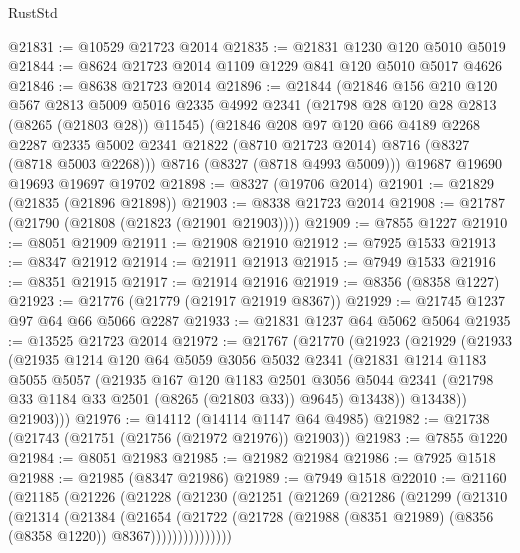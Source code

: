 \begin{lexlean}{RustStd}
\begin{coremodule}
@21831 := @10529 @21723 @2014
@21835 := @21831 @1230 @120 @5010 @5019
@21844 := @8624 @21723 @2014 @1109 @1229 @841 @120 @5010 @5017 @4626
@21846 := @8638 @21723 @2014
@21896 := @21844
    (@21846
      @156
      @210
      @120
      @567
      @2813
      @5009
      @5016
      @2335
      @4992
      @2341
      (@21798 @28 @120 @28 @2813 (@8265 (@21803 @28)) @11545)
      (@21846
        @208
        @97
        @120
        @66
        @4189
        @2268
        @2287
        @2335
        @5002
        @2341
        @21822
        (@8710 @21723 @2014)
        @8716
        (@8327 (@8718 @5003 @2268)))
      @8716
      (@8327 (@8718 @4993 @5009)))
    @19687
    @19690
    @19693
    @19697
    @19702
@21898 := @8327 (@19706 @2014)
@21901 := @21829 (@21835 (@21896 @21898))
@21903 := @8338 @21723 @2014
@21908 := @21787 (@21790 (@21808 (@21823 (@21901 @21903))))
@21909 := @7855 @1227
@21910 := @8051 @21909
@21911 := @21908 @21910
@21912 := @7925 @1533
@21913 := @8347 @21912
@21914 := @21911 @21913
@21915 := @7949 @1533
@21916 := @8351 @21915
@21917 := @21914 @21916
@21919 := @8356 (@8358 @1227)
@21923 := @21776 (@21779 (@21917 @21919 @8367))
@21929 := @21745 @1237 @97 @64 @66 @5066 @2287
@21933 := @21831 @1237 @64 @5062 @5064
@21935 := @13525 @21723 @2014
@21972 := @21767
    (@21770
      (@21923
        (@21929
          (@21933
            (@21935
              @1214
              @120
              @64
              @5059
              @3056
              @5032
              @2341
              (@21831
                @1214
                @1183
                @5055
                @5057
                (@21935
                  @167
                  @120
                  @1183
                  @2501
                  @3056
                  @5044
                  @2341
                  (@21798 @33 @1184 @33 @2501 (@8265 (@21803 @33)) @9645)
                  @13438))
              @13438))
          @21903)))
@21976 := @14112 (@14114 @1147 @64 @4985)
@21982 := @21738 (@21743 (@21751 (@21756 (@21972 @21976)) @21903))
@21983 := @7855 @1220
@21984 := @8051 @21983
@21985 := @21982 @21984
@21986 := @7925 @1518
@21988 := @21985 (@8347 @21986)
@21989 := @7949 @1518
@22010 := @21160
    (@21185
      (@21226
        (@21228
          (@21230
            (@21251
              (@21269
                (@21286
                  (@21299
                    (@21310
                      (@21314
                        (@21384
                          (@21654
                            (@21722
                              (@21728
                                (@21988 (@8351 @21989) (@8356 (@8358 @1220)) @8367)))))))))))))))

\end{coremodule}
\end{lexlean}
